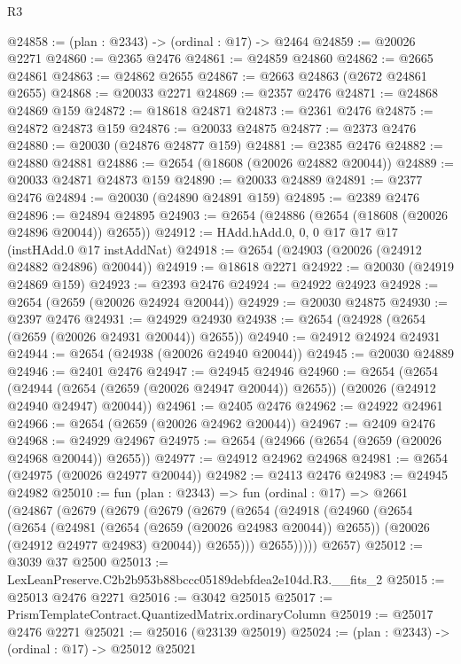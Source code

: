 \begin{lexlean}{R3}
\begin{coremodule}
@24858 := (plan : @2343) -> (ordinal : @17) -> @2464
@24859 := @20026 @2271
@24860 := @2365 @2476
@24861 := @24859 @24860
@24862 := @2665 @24861
@24863 := @24862 @2655
@24867 := @2663 @24863 (@2672 @24861 @2655)
@24868 := @20033 @2271
@24869 := @2357 @2476
@24871 := @24868 @24869 @159
@24872 := @18618 @24871
@24873 := @2361 @2476
@24875 := @24872 @24873 @159
@24876 := @20033 @24875
@24877 := @2373 @2476
@24880 := @20030 (@24876 @24877 @159)
@24881 := @2385 @2476
@24882 := @24880 @24881
@24886 := @2654 (@18608 (@20026 @24882 @20044))
@24889 := @20033 @24871 @24873 @159
@24890 := @20033 @24889
@24891 := @2377 @2476
@24894 := @20030 (@24890 @24891 @159)
@24895 := @2389 @2476
@24896 := @24894 @24895
@24903 := @2654 (@24886 (@2654 (@18608 (@20026 @24896 @20044)) @2655))
@24912 := HAdd.hAdd.{0, 0, 0} @17 @17 @17 (instHAdd.{0} @17 instAddNat)
@24918 := @2654 (@24903 (@20026 (@24912 @24882 @24896) @20044))
@24919 := @18618 @2271
@24922 := @20030 (@24919 @24869 @159)
@24923 := @2393 @2476
@24924 := @24922 @24923
@24928 := @2654 (@2659 (@20026 @24924 @20044))
@24929 := @20030 @24875
@24930 := @2397 @2476
@24931 := @24929 @24930
@24938 := @2654 (@24928 (@2654 (@2659 (@20026 @24931 @20044)) @2655))
@24940 := @24912 @24924 @24931
@24944 := @2654 (@24938 (@20026 @24940 @20044))
@24945 := @20030 @24889
@24946 := @2401 @2476
@24947 := @24945 @24946
@24960 := @2654
    (@2654
      (@24944 (@2654 (@2659 (@20026 @24947 @20044)) @2655))
      (@20026 (@24912 @24940 @24947) @20044))
@24961 := @2405 @2476
@24962 := @24922 @24961
@24966 := @2654 (@2659 (@20026 @24962 @20044))
@24967 := @2409 @2476
@24968 := @24929 @24967
@24975 := @2654 (@24966 (@2654 (@2659 (@20026 @24968 @20044)) @2655))
@24977 := @24912 @24962 @24968
@24981 := @2654 (@24975 (@20026 @24977 @20044))
@24982 := @2413 @2476
@24983 := @24945 @24982
@25010 := fun (plan : @2343) =>
  fun (ordinal : @17) =>
  @2661
    (@24867
      (@2679
        (@2679
          (@2679
            (@2679
              (@2654
                (@24918
                  (@24960
                    (@2654
                      (@2654
                        (@24981 (@2654 (@2659 (@20026 @24983 @20044)) @2655))
                        (@20026 (@24912 @24977 @24983) @20044))
                      @2655)))
                @2655)))))
      @2657)
@25012 := @3039 @37 @2500
@25013 := LexLeanPreserve.C2b2b953b88bccc05189debfdea2e104d.R3.__fits_2
@25015 := @25013 @2476 @2271
@25016 := @3042 @25015
@25017 := PrismTemplateContract.QuantizedMatrix.ordinaryColumn
@25019 := @25017 @2476 @2271
@25021 := @25016 (@23139 @25019)
@25024 := (plan : @2343) -> (ordinal : @17) -> @25012 @25021

\end{coremodule}
\end{lexlean}
